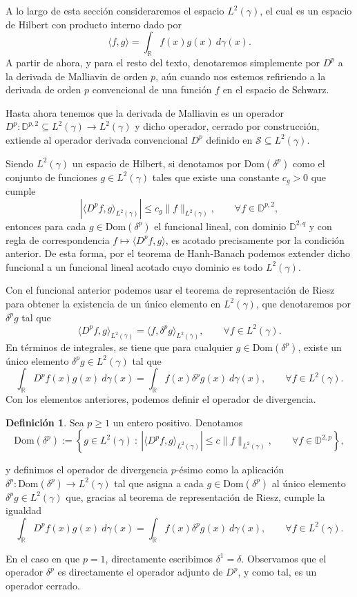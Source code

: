 \documentclass[letterpaper,twoside,12pt]{book}
\newcommand{\R}{\mathbb{R}}
\newcommand{\D}{\mathbb{D}}
\newcommand{\1}{\mathds{1}}
\newcommand{\abs}[1]{\left\lvert #1 \right\rvert}
\theoremstyle{definition}
\newtheorem{dfn}{Definición}
\theoremstyle{definition}
\theoremstyle{remark}
\theoremstyle{definition}
\theoremstyle{definition}
\theoremstyle{definition}
\theoremstyle{definition}
\theoremstyle{definition}
\begin{document}
A lo largo de esta sección consideraremos el espacio $L^2(\gamma)$, el cual es un espacio de Hilbert con producto interno dado por 
\[
\langle f,g\rangle=\int_\R f(x)g(x)\ d\gamma(x).
\]
A partir de ahora, y para el resto del texto, denotaremos simplemente por $D^{p}$ a la derivada de Malliavin de orden $p$, aún cuando nos estemos refiriendo a la derivada de orden $p$ convencional de una función $f$ en el espacio de Schwarz.

Hasta ahora tenemos que la derivada de Malliavin es un operador $D^{p}:\mathbb{D}^{p,2}\subseteq L^2(\gamma)\longrightarrow L^2(\gamma)$ y dicho operador, cerrado por construcción, extiende al operador derivada convencional $D^{p}$ definido en $\mathcal{S}\subseteq L^2(\gamma)$. 

Siendo $L^{2}(\gamma)$ un espacio de Hilbert, si denotamos por $\text{Dom}(\delta^{p})$ como el conjunto de funciones $g\in L^{2}(\gamma)$ tales que existe una constante $c_g>0$ que cumple
\[
\abs{\langle D^{p}f,g\rangle_{L^2(\gamma)}}\leq c_g\|f\|_{L^2(\gamma)}, \qquad \forall f\in \mathbb{D}^{p,2},                 
\]
entonces para cada $g\in \text{Dom}(\delta^{p})$ el funcional lineal, con dominio $\D^{2,q}$ y con regla de correspondencia $f\longmapsto \langle D^{p}f,g\rangle$, es acotado precisamente por la condición anterior. De esta forma, por el teorema de Hanh-Banach podemos extender dicho funcional a un funcional lineal acotado cuyo dominio es todo $L^2(\gamma)$.

Con el funcional anterior podemos usar el teorema de representación de Riesz para obtener la existencia de un único elemento en $L^2(\gamma)$, que denotaremos por $\delta^{p}g$ tal que 
\[
\langle D^pf,g\rangle_{L^2(\gamma)}=\langle f,\delta^p g\rangle_{L^2(\gamma)}, \qquad \forall f\in L^2(\gamma).
\]
En términos de integrales, se tiene que para cualquier $g\in \text{Dom}(\delta^p)$, existe un único elemento $\delta^p g\in L^2(\gamma)$ tal que 
\[
 \int_\R D^{p}f(x) g(x) \ d\gamma(x)=\int_\R f(x)\delta^{p}g(x) \ d\gamma(x), \qquad \forall f\in L^2(\gamma).  
\]
Con los elementos anteriores, podemos definir el operador de divergencia.

\begin{dfn}
   Sea $p\geq1$ un entero positivo. Denotamos $$\text{Dom}(\delta^p):=\left\{g\in L^2(\gamma) \ : \ \abs{\langle D^{p}f,g\rangle_{L^2(\gamma)}}\leq c\|f\|_{L^2(\gamma)}, \qquad \forall f\in \D^{2,p}\right\},$$ 

   y definimos el operador de divergencia $p$-ésimo como la aplicación $\delta^p:\text{Dom}(\delta^{p})\longrightarrow L^2(\gamma)$ tal que asigna a cada $g\in \text{Dom}(\delta^{p})$ al único elemento $\delta^{p} g\in L^2(\gamma)$ que, gracias al teorema de representación de Riesz, cumple la igualdad
       \[
       \int_\R D^{p}f(x)g(x) \ d\gamma(x)=\int_\R f(x)\delta^{p}g(x) \ d\gamma(x), \qquad \forall f\in L^2(\gamma).
      \]
\end{dfn}
En el caso en que $p=1$, directamente escribimos $\delta^1=\delta$. Observamos que el operador $\delta^p$ es directamente el operador adjunto de $D^{p}$, y como tal, es un operador cerrado.
\end{document}

